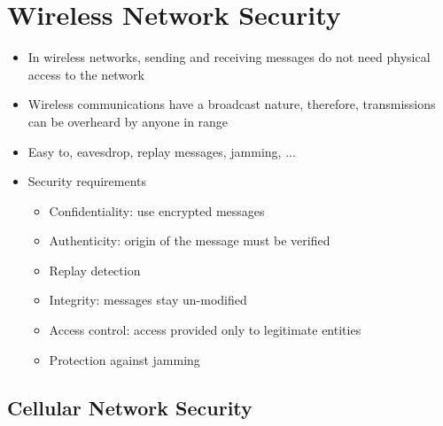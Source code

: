 \section{Wireless Network Security}
\begin{itemize}
	\item In wireless networks, sending and receiving messages do not need physical access to the network
	\item Wireless communications have a broadcast nature, therefore, transmissions can be overheard by anyone in range
	\item Easy to, eavesdrop, replay messages, jamming, ...
	\item Security requirements
	\begin{itemize}
		\item Confidentiality: use encrypted messages
		\item Authenticity: origin of the message must be verified
		\item Replay detection
		\item Integrity: messages stay un-modified
		\item Access control: access provided only to legitimate entities
		\item Protection against jamming
	\end{itemize}
\end{itemize}
\subsection{Cellular Network Security}
